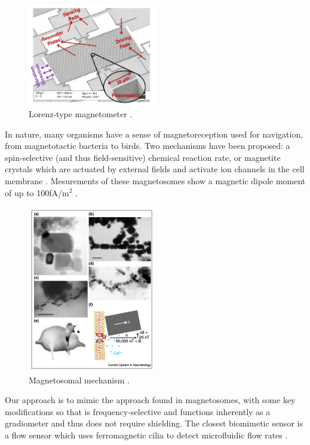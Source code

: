 \begin{figure}[h]
\centering
\includegraphics[width=0.5\textwidth]{lorenz2}
\caption{Lorenz-type magnetometer \cite{kumar2015ultra}.}
\label{fig:lorenz}
\end{figure}

In nature, many organisms have a sense of magnetoreception used for navigation, from magnetotactic bacteria to birds. Two mechanisms have been proposed: a spin-selective (and thus field-sensitive) chemical reaction rate, or magnetite crystals which are actuated by external fields and activate ion channels in the cell membrane \cite{johnsen2005physics,dodson2013radical,kirschvink2001magnetite}. Mesurements of these magnetosomes show a magnetic dipole moment of up to 100fA/m$^2$ \cite{hanzlik2002pulsed,eder2012magnetic}.

\begin{figure}
\centering
\includegraphics[width=0.5\textwidth]{kirsh2001}
\caption{Magnetosomal mechanism \cite{kirschvink2001magnetite}.}
\label{fig:magnetsosome}
\end{figure}

Our approach is to mimic the approach found in magnetosomes, with some key modifications so that is frequency-selective and functions inherently as a gradiometer and thus does not require shielding. The closest biomimetic sensor is a flow sensor which uses ferromagnetic cilia to detect microfluidic flow rates \cite{alfadhel2014magnetic}.

